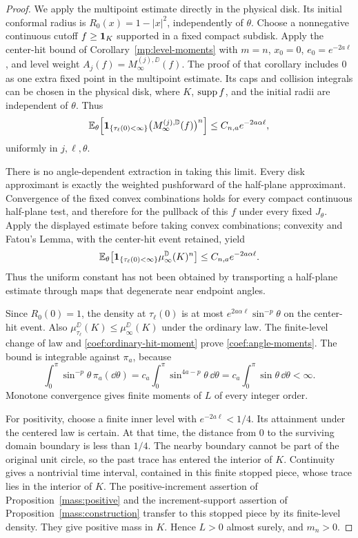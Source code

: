 \begin{proof}
We apply the multipoint estimate directly in the physical disk.
Its initial conformal radius is $R_0(x)=1-|x|^2$, independently of
$\theta$.  Choose a nonnegative continuous cutoff $f\ge\mathbf 1_K$ supported
in a fixed compact subdisk.  Apply the center-hit bound of Corollary~\ref{mp:level-moments} with
$m=n$, $x_0=0$, $e_0=e^{-2a\ell}$, and level weight
$A_j(f)=M_\infty^{(j),\DD}(f)$.  The proof of that corollary includes
$0$ as one extra fixed point in the multipoint estimate.  Its caps and
collision integrals can be chosen in the physical disk, where $K$,
$\operatorname{supp} f$, and the initial radii are independent of $\theta$.  Thus
\[
 \mathbb E_\theta\!\left[
   \mathbf 1_{\{\tau_\ell(0)<\infty\}}
   \bigl(M_\infty^{(j),\mathbb D}(f)\bigr)^n\right]
       \le C_{n,a}e^{-2a\alpha\ell},
\]
uniformly in $j,\ell,\theta$.

There is no angle-dependent extraction in taking this limit.
Every disk approximant is exactly the weighted pushforward of the
half-plane approximant.  Convergence of the fixed convex combinations
holds for every compact continuous half-plane test, and therefore for
the pullback of this $f$ under every fixed $J_\theta$.
Apply the displayed estimate before taking convex combinations;
convexity and Fatou's Lemma, with the center-hit event retained, yield
\begin{equation}
 \mathbb E_\theta\bigl[
   \mathbf 1_{\{\tau_\ell(0)<\infty\}}\mu_\infty^{\mathbb D}(K)^n\bigr]
       \le C_{n,a}e^{-2a\alpha\ell}.
 \label{coef:ordinary-hit-moment}
\end{equation}
Thus the uniform constant has not been obtained by transporting a
half-plane estimate through maps that degenerate near endpoint angles.

Since $R_0(0)=1$, the density at $\tau_\ell(0)$ is at most
$e^{2a\alpha\ell}\sin^{-p}\theta$ on the center-hit event.
Also $\mu_{\tau_\ell}^{\DD}(K)\le\mu_\infty^{\DD}(K)$ under the ordinary
law.  The finite-level change of law and
\eqref{coef:ordinary-hit-moment} prove \eqref{coef:angle-moments}.
The bound is integrable against $\pi_a$, because
\[
 \int_0^\pi\sin^{-p}\theta\,\pi_a(\dd\theta)
    =c_a\int_0^\pi\sin^{4a-p}\theta\,\dd\theta
    =c_a\int_0^\pi\sin\theta\,\dd\theta<\infty.
\]
Monotone convergence gives finite moments of $L$ of every integer order.

For positivity, choose a finite inner level with
$e^{-2a\ell}<1/4$.  Its attainment under the centered law is certain.
At that time, the distance from $0$ to the surviving domain boundary is
less than $1/4$.  The nearby boundary cannot be part of the original
unit circle, so the past trace has entered the interior of $K$.
Continuity gives a nontrivial time interval, contained in this finite
stopped piece, whose trace lies in the interior of $K$.
The positive-increment assertion of Proposition~\ref{mass:positive}
and the increment-support assertion of Proposition~\ref{mass:construction}
transfer to this stopped piece by its finite-level density.  They give
positive mass in $K$.  Hence $L>0$ almost surely, and $m_n>0$.
\end{proof}

